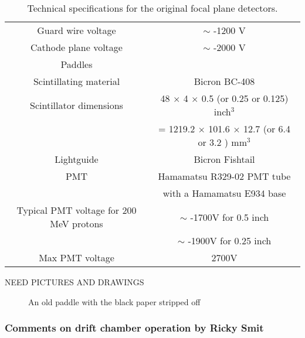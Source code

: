 \documentclass[11pt]{report}
\begin{document}
\begin{table}[!ht]
\begin{tabular}{c|c}
Guard wire voltage & $\sim$ -1200 V\\
Cathode plane voltage & $\sim$ -2000 V\\
\hline
\hline
Paddles & \\
\hline
Scintillating material & Bicron BC-408\\
Scintillator dimensions & 48 $\times$ 4 $\times$ 0.5 (or 0.25 or 0.125) inch$^3$\\
& = 1219.2 $\times$ 101.6 $\times$ 12.7 (or 6.4 or 3.2 ) mm$^3$ \\
Lightguide & Bicron Fishtail\\
PMT & Hamamatsu R329-02 PMT tube \\
& with a Hamamatsu E934 base\\
Typical PMT voltage for 200 MeV protons &  $\sim$ -1700V for 0.5 inch\\
&  $\sim$ -1900V for 0.25 inch\\
Max PMT voltage & 2700V \\

\hline
\hline
\end{tabular}
\caption{Technical specifications for the original focal plane detectors.}
\label{table:fpdet-specs}
\end{table}


NEED PICTURES AND DRAWINGS
\begin{figure}
\centering

\caption{An old paddle with the black paper stripped off}
\label{fig:oldpaddles}
\end{figure}

\subsubsection{Comments on drift chamber operation by Ricky Smit}
\end{document}
